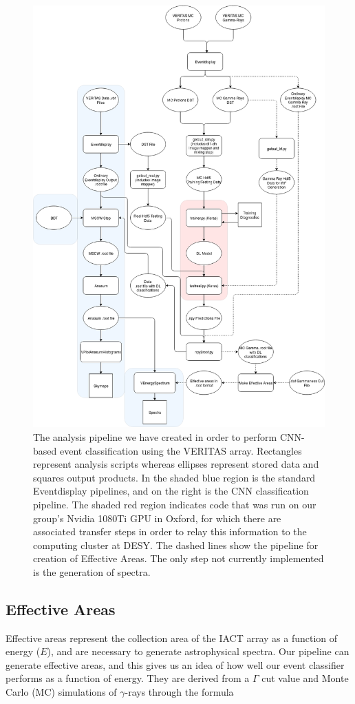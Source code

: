 \begin{figure}[t!] 
        \centering \includegraphics[width=0.83\columnwidth]{figures/Gettingout.png}

        \caption{
                \label{fig:Gettingout} The analysis pipeline we have created in order to perform CNN-based event classification using the VERITAS array. Rectangles represent analysis scripts whereas ellipses represent stored data and squares output products. In the shaded blue region is the standard Eventdisplay pipelines, and on the right is the CNN classification pipeline. The shaded red region indicates code that was run on our group's Nvidia 1080Ti GPU in Oxford, for which there are associated transfer steps in order to relay this information to the computing cluster at DESY. The dashed lines show the pipeline for creation of Effective Areas. The only step not currently implemented is the generation of spectra.
        }
\end{figure}

\subsection{Effective Areas}
 Effective areas represent the collection area of the IACT array as a function of energy ($E$), and are necessary to generate astrophysical spectra. Our pipeline can generate effective areas, and this gives us an idea of how well our event classifier performs as a function of energy.  They are derived from a $\Gamma$ cut value and Monte Carlo (MC) simulations of $\gamma$-rays through the formula

